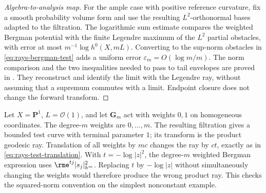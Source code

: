 \begin{proof}[Algebra-to-analysis map]
For the ample case with positive reference curvature, fix a smooth probability
volume form and use the resulting $L^2$-orthonormal bases adapted to the
filtration. The logarithmic sum estimate compares the weighted Bergman
potential with the finite Legendre maximum of the $L^2$ partial obstacles, with
error at most $m^{-1}\log h^0(X,mL)$. Converting to the sup-norm obstacles in
\eqref{eq:rays-bergman-test} adds a uniform error $\varepsilon_m=O(\log m/m)$.
The norm comparison and the two inequalities needed to pass to tail envelopes
are proved in
.
They reconstruct \cite[Theorem~9.2]{RWN14} and identify the limit with the
Legendre ray, without assuming that a supremum commutes with a limit. Endpoint
closure does not change the forward transform.
\end{proof}

\begin{example}
\label{ex:rays-p1-action}
Let $X=\mathbf P^1$, $L=\mathcal O(1)$, and let
$\mathbf G_m$ act with weights $0,1$ on homogeneous coordinates.
The degree-$m$ weights are $0,\ldots,m$.  The resulting filtration
gives a bounded test curve with terminal parameter $1$; its transform
is the product geodesic ray.  Translation of all weights by $mc$
changes the ray by $ct$, exactly as in
\eqref{eq:rays-test-translation}.
With $t=-\log|z|^2$, the degree-$m$ weighted Bergman expression uses
$\rme^{tj}|s_j|_{h^m}^2$.  Replacing $t$ by $-\log|z|$ without
simultaneously changing the weights would therefore produce the wrong
product ray.  This checks the squared-norm convention on the simplest
nonconstant example.
\end{example}

